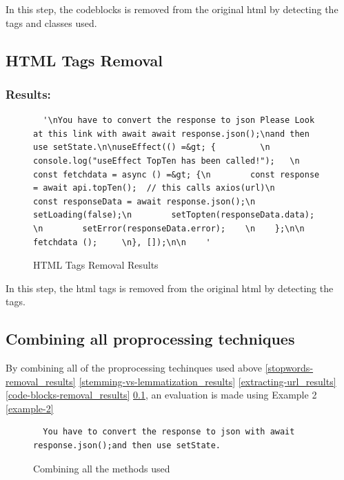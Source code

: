 \noindent In this step, the codeblocks is removed from the original html by detecting the tags and classes used.

\subsection{HTML Tags Removal} \label{html-tags-removal_results}
\subsubsection{Results:} \label{html-tags_results_results}
\begin{figure}[H]
\noindent\begin{lstlisting}
  '\nYou have to convert the response to json Please Look at this link with await await response.json();\nand then use setState.\n\nuseEffect(() =&gt; {         \n        console.log("useEffect TopTen has been called!");   \n        const fetchdata = async () =&gt; {\n        const response = await api.topTen();  // this calls axios(url)\n        const responseData = await response.json();\n        setLoading(false);\n        setTopten(responseData.data);    \n        setError(responseData.error);    \n    };\n\n    fetchdata ();     \n}, []);\n\n    '
\end{lstlisting}
 
\caption{HTML Tags Removal Results}
\label{fig:html-tags-removal_results_results}
\end{figure}

\noindent In this step, the html tags is removed from the original html by detecting the tags.

\subsection{Combining all proprocessing techniques} \label{combining-all-the-methods-used_results}
By combining all of the proprocessing techinques used above \ref{stopwords-removal_results} \ref{stemming-vs-lemmatization_results} \ref{extracting-url_results} \ref{code-blocks-removal_results} \ref{html-tags-removal_results}, an evaluation is made using Example 2 \ref{example-2}

\begin{figure}[H]
\noindent\begin{lstlisting}
  You have to convert the response to json with await response.json();and then use setState. 
\end{lstlisting}
\caption{Combining all the methods used}
\label{fig:combining-all-the-methods-used_results}
\end{figure}

